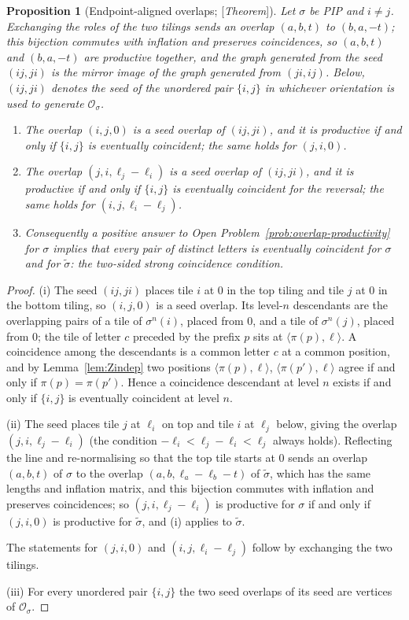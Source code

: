 \documentclass[11pt]{amsart}
\theoremstyle{plain}
\newtheorem{proposition}[theorem]{Proposition}
\theoremstyle{definition}
\theoremstyle{remark}
\newcommand{\Status}[1]{\textup{[\textit{#1}]}}
\begin{document}
\begin{proposition}[Endpoint-aligned overlaps; \Status{Theorem}]\label{prop:aligned-overlaps}
Let $\sigma$ be PIP and $i\ne j$. Exchanging the roles of the two tilings sends an overlap $(a,b,t)$ to $(b,a,-t)$; this bijection commutes with inflation and preserves coincidences, so $(a,b,t)$ and $(b,a,-t)$ are productive together, and the graph generated from the seed $(ij,ji)$ is the mirror image of the graph generated from $(ji,ij)$. Below, $(ij,ji)$ denotes the seed of the unordered pair $\{i,j\}$ in whichever orientation is used to generate $\mathcal O_\sigma$.
\begin{enumerate}[label=\textup{(\roman*)},leftmargin=*]
\item The overlap $(i,j,0)$ is a seed overlap of $(ij,ji)$, and it is productive if and only if $\{i,j\}$ is eventually coincident; the same holds for $(j,i,0)$.
\item The overlap $(j,i,\ell_j-\ell_i)$ is a seed overlap of $(ij,ji)$, and it is productive if and only if $\{i,j\}$ is eventually coincident for the reversal; the same holds for $(i,j,\ell_i-\ell_j)$.
\item Consequently a positive answer to Open Problem~\ref{prob:overlap-productivity} for $\sigma$ implies that every pair of distinct letters is eventually coincident for $\sigma$ and for $\tilde\sigma$: the two-sided strong coincidence condition.
\end{enumerate}
\end{proposition}
\begin{proof}
(i) The seed $(ij,ji)$ places tile $i$ at $0$ in the top tiling and tile $j$ at $0$ in the bottom tiling, so $(i,j,0)$ is a seed overlap. Its level-$n$ descendants are the overlapping pairs of a tile of $\sigma^n(i)$, placed from $0$, and a tile of $\sigma^n(j)$, placed from $0$; the tile of letter $c$ preceded by the prefix $p$ sits at $\langle\pi(p),\ell\rangle$. A coincidence among the descendants is a common letter $c$ at a common position, and by Lemma~\ref{lem:Zindep} two positions $\langle\pi(p),\ell\rangle$, $\langle\pi(p'),\ell\rangle$ agree if and only if $\pi(p)=\pi(p')$. Hence a coincidence descendant at level $n$ exists if and only if $\{i,j\}$ is eventually coincident at level $n$.

(ii) The seed places tile $j$ at $\ell_i$ on top and tile $i$ at $\ell_j$ below, giving the overlap $(j,i,\ell_j-\ell_i)$ (the condition $-\ell_i<\ell_j-\ell_i<\ell_j$ always holds). Reflecting the line and re-normalising so that the top tile starts at $0$ sends an overlap $(a,b,t)$ of $\sigma$ to the overlap $(a,b,\ell_a-\ell_b-t)$ of $\tilde\sigma$, which has the same lengths and inflation matrix, and this bijection commutes with inflation and preserves coincidences; so $(j,i,\ell_j-\ell_i)$ is productive for $\sigma$ if and only if $(j,i,0)$ is productive for $\tilde\sigma$, and (i) applies to $\tilde\sigma$.

The statements for $(j,i,0)$ and $(i,j,\ell_i-\ell_j)$ follow by exchanging the two tilings.

(iii) For every unordered pair $\{i,j\}$ the two seed overlaps of its seed are vertices of $\mathcal O_\sigma$.
\end{proof}
\end{document}

